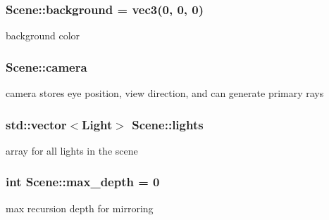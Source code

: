 \subsubsection[{\texorpdfstring{background}{background}}]{ Scene\+::background = {\bf vec3}(0, 0, 0)\hspace{0.3cm}{\ttfamily [private]}}\hypertarget{classScene_ab2f20cf753edf2f92fec9b1ad7c9b93e}{}\label{classScene_ab2f20cf753edf2f92fec9b1ad7c9b93e}


background color 

\subsubsection[{\texorpdfstring{camera}{camera}}]{ Scene\+::camera\hspace{0.3cm}{\ttfamily [private]}}\hypertarget{classScene_afed13ec4ba2d7ab75b273d507911b498}{}\label{classScene_afed13ec4ba2d7ab75b273d507911b498}


camera stores eye position, view direction, and can generate primary rays 

\subsubsection[{\texorpdfstring{lights}{lights}}]{\setlength{\rightskip}{0pt plus 5cm}std\+::vector$<${\bf Light}$>$ Scene\+::lights\hspace{0.3cm}{\ttfamily [private]}}\hypertarget{classScene_ab3625e4ac3c6e47156edd23e2421e828}{}\label{classScene_ab3625e4ac3c6e47156edd23e2421e828}


array for all lights in the scene 

\subsubsection[{\texorpdfstring{max\+\_\+depth}{max_depth}}]{\setlength{\rightskip}{0pt plus 5cm}int Scene\+::max\+\_\+depth = 0\hspace{0.3cm}{\ttfamily [private]}}\hypertarget{classScene_a9150039f4d2c46a617b51c7920142d52}{}\label{classScene_a9150039f4d2c46a617b51c7920142d52}


max recursion depth for mirroring 

